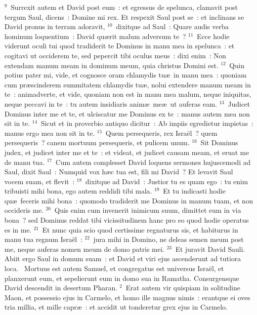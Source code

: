 ${}^{9}$~Surrexit autem et David post eum~: et egressus de spelunca, clamavit post tergum Saul, dicens~: Domine mi rex. Et respexit Saul post se~: et inclinans se David pronus in terram adoravit,
${}^{10}$~dixitque ad Saul~: Quare audis verba hominum loquentium~: David qu\ae rit malum adversum te~?
${}^{11}$~Ecce hodie viderunt oculi tui quod tradiderit te Dominus in manu mea in spelunca~: et cogitavi ut occiderem te, sed pepercit tibi oculus meus~: dixi enim~: Non extendam manum meam in dominum meum, quia christus Domini est.
${}^{12}$~Quin potius pater mi, vide, et cognosce oram chlamydis tu\ae\ in manu mea~: quoniam cum pr\ae scinderem summitatem chlamydis tu\ae , nolui extendere manum meam in te~: animadverte, et vide, quoniam non est in manu mea malum, neque iniquitas, neque peccavi in te~: tu autem insidiaris anim\ae\ me\ae\ ut auferas eam.
${}^{13}$~Judicet Dominus inter me et te, et ulciscatur me Dominus ex te~: manus autem mea non sit in te.
${}^{14}$~Sicut et in proverbio antiquo dicitur~: Ab impiis egredietur impietas~: manus ergo mea non sit in te.
${}^{15}$~Quem persequeris, rex Isra\"el~? quem persequeris~? canem mortuum persequeris, et pulicem unum.
${}^{16}$~Sit Dominus judex, et judicet inter me et te~: et videat, et judicet causam meam, et eruat me de manu tua.
${}^{17}$~Cum autem complesset David loquens sermones hujuscemodi ad Saul, dixit Saul~: Numquid vox h\ae c tua est, fili mi David~? Et levavit Saul vocem suam, et flevit~:
${}^{18}$~dixitque ad David~: Justior tu es quam ego~: tu enim tribuisti mihi bona, ego autem reddidi tibi mala.
${}^{19}$~Et tu indicasti hodie qu\ae\ feceris mihi bona~: quomodo tradiderit me Dominus in manum tuam, et non occideris me.
${}^{20}$~Quis enim cum invenerit inimicum suum, dimittet eum in via bona~? sed Dominus reddat tibi vicissitudinem hanc pro eo quod hodie operatus es in me.
${}^{21}$~Et nunc quia scio quod certissime regnaturus sis, et habiturus in manu tua regnum Isra\"el~:
${}^{22}$~jura mihi in Domino, ne deleas semen meum post me, neque auferas nomen meum de domo patris mei.
${}^{23}$~Et juravit David Sauli. Abiit ergo Saul in domum suam~: et David et viri ejus ascenderunt ad tutiora loca.
~\lettrine[lines=10,image=true,loversize=0.05,lraise=-0.03]{M}{}ortuus est autem Samuel, et congregatus est universus Isra\"el, et planxerunt eum, et sepelierunt eum in domo sua in Ramatha. Consurgensque David descendit in desertum Pharan.
${}^{2}$~Erat autem vir quispiam in solitudine Maon, et possessio ejus in Carmelo, et homo ille magnus nimis~: erantque ei oves tria millia, et mille capr\ae~: et accidit ut tonderetur grex ejus in Carmelo.
